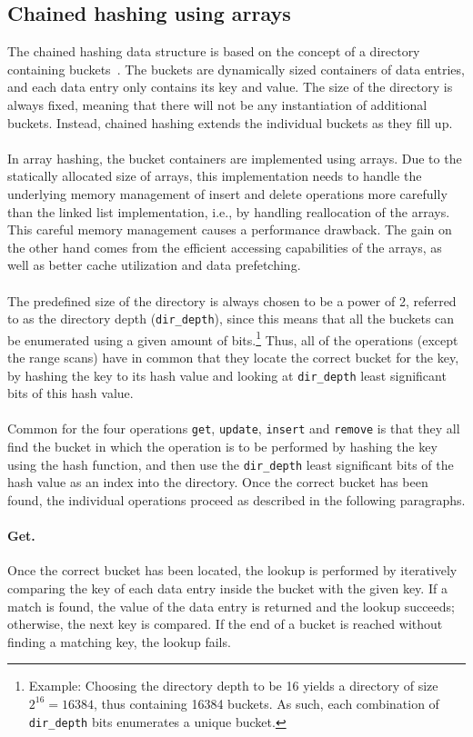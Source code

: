 \documentclass[11pt]{report} %
\begin{document}
\subsection{Chained hashing using arrays}
\label{subsec:background_chained_hashing_using_arrays}
The chained hashing data structure is based on the concept of a directory containing buckets~\cite{ItA092}. The buckets are dynamically sized containers of data entries, and each data entry only contains its key and value.
The size of the directory is always fixed, meaning that there will not be any instantiation of additional buckets. Instead, chained hashing extends the individual buckets as they fill up. \\
\\
In array hashing, the bucket containers are implemented using arrays. Due to the statically allocated size of arrays, this implementation needs to handle the underlying memory management of insert and delete operations more carefully than the linked list implementation, i.e., by handling reallocation of the arrays. This careful memory management causes a performance drawback. The gain on the other hand comes from the efficient accessing capabilities of the arrays, as well as better cache utilization and data prefetching.\\
\\
The predefined size of the directory is always chosen to be a power of 2, referred to as the directory depth (\verb|dir_depth|), since this means that all the buckets can be enumerated using a given amount of bits.\footnote{Example: Choosing the directory depth to be 16 yields a directory of size $2^{16} = 16384$, thus containing 16384 buckets. As such, each combination of \verb|dir_depth| bits enumerates a unique bucket.} Thus, all of the operations (except the range scans) have in common that they locate the correct bucket for the key, by hashing the key to its hash value and looking at \verb|dir_depth| least significant bits of this hash value. \\
\\
Common for the four operations \verb|get|, \verb|update|, \verb|insert| and \verb|remove| is that they all find the bucket in which the operation is to be performed by hashing the key using the hash function, and then use the \verb|dir_depth| least significant bits of the hash value as an index into the directory. Once the correct bucket has been found, the individual operations proceed as described in the following paragraphs.

\paragraph{Get.} Once the correct bucket has been located, the lookup is performed by iteratively comparing the key of each data entry inside the bucket with the given key. If a match is found, the value of the data entry is returned and the lookup succeeds; otherwise, the next key is compared. If the end of a bucket is reached without finding a matching key, the lookup fails. 
\end{document}
